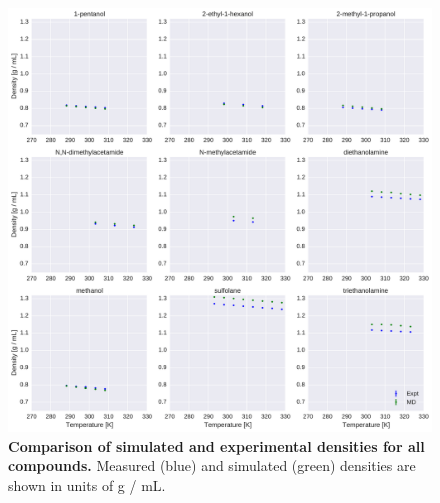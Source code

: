 \documentclass[aps,pre,twocolumn,nofootinbib,superscriptaddress,linenumbers]{revtex4-1}
\begin{document}
\begin{figure}[alldensity]

\ContinuedFloat

\includegraphics[width=\textwidth]{./figures/densities_versus_temperature_part2.pdf}

\caption{{\bf Comparison of simulated and experimental densities for all compounds.} 
Measured (blue) and simulated (green) densities are shown in units of g / mL.
\label{figure:AllDensities}
}

\end{figure}
\end{document}
